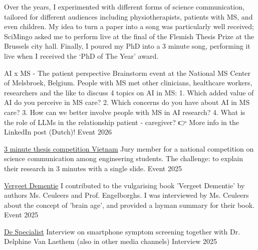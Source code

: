 
Over the years, I experimented with different forms of science communication,  tailored for different audiences including physiotherapists, patients with MS,  and even children. My idea to turn a paper into a song was particularly well received;  SciMingo asked me to perform live at the final of the Flemish Thesis Prize  at the Brussels city hall. Finally, I poured my PhD into a 3 minute song,  performing it live when I received the ‘PhD of The Year’ award.


\begin{cvhonors}

  \cvhonor
    {AI x MS - The patient perspective} %
    {Brainstorm event at the National MS Center of Melsbroek, Belgium. People with MS met other clinicians, healthcare workers, researchers and the like to discuss 4 topics on AI in MS: 1. Which added value of AI do you perceive in MS care? 2. Which concerns do you have about AI in MS care? 3. How can we better involve people with MS in AI research? 4. What is the role of LLMs in the relationship patient - caregiver? 👉 More info in the LinkedIn post (Dutch)!} %
    {Event} %
    {2026} %

  \cvhonor
    {\href{https://aiptit3mtcompetition.pages.dev/}{3 minute thesis competition Vietnam}} %
    {Jury member for a national competition on science communication among engineering students. The challenge: to explain their research in 3 minutes with a single slide.} %
    {Event} %
    {2025} %

  \cvhonor
    {\href{https://ertsberg.be/boek/vergeet-dementie/}{Vergeet Dementie}} %
    {I contributed to the vulgarising book 'Vergeet Dementie' by authors Ms. Ceuleers and Prof. Engelborghs. I was interviewed by Ms. Ceuleers about the concept of 'brain age', and provided a layman summary for their book.} %
    {Event} %
    {2025} %

  \cvhonor
    {\href{https://www.despecialist.eu/nl/nieuws/nieuwe-vub-app-moet-helpen-bij-snellere-screening-multiple-sclerose.html}{De Specialist}} %
    {Interview on smartphone symptom screening together with Dr. Delphine Van Laethem (also in other media channels)} %
    {Interview} %
    {2025} %


\end{cvhonors}
